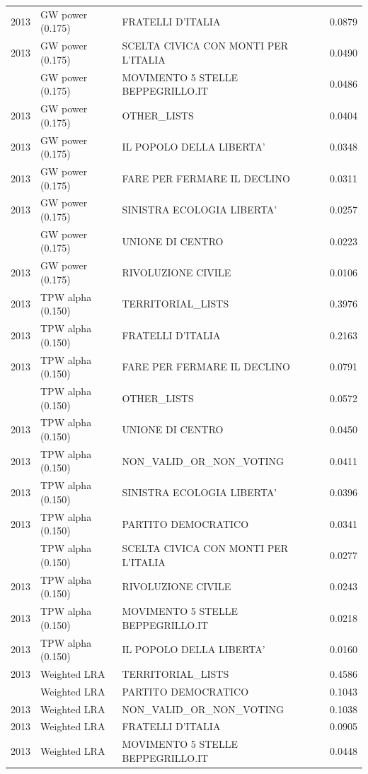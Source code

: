 \begin{longtable}[t]{rllr}
2013 & GW power (0.175) & FRATELLI D'ITALIA & 0.0879\\
2013 & GW power (0.175) & SCELTA CIVICA CON MONTI PER L'ITALIA & 0.0490\\
\addlinespace
2013 & GW power (0.175) & MOVIMENTO 5 STELLE BEPPEGRILLO.IT & 0.0486\\
2013 & GW power (0.175) & OTHER\_LISTS & 0.0404\\
2013 & GW power (0.175) & IL POPOLO DELLA LIBERTA' & 0.0348\\
2013 & GW power (0.175) & FARE PER FERMARE IL DECLINO & 0.0311\\
2013 & GW power (0.175) & SINISTRA ECOLOGIA LIBERTA' & 0.0257\\
\addlinespace
2013 & GW power (0.175) & UNIONE DI CENTRO & 0.0223\\
2013 & GW power (0.175) & RIVOLUZIONE CIVILE & 0.0106\\
2013 & TPW alpha (0.150) & TERRITORIAL\_LISTS & 0.3976\\
2013 & TPW alpha (0.150) & FRATELLI D'ITALIA & 0.2163\\
2013 & TPW alpha (0.150) & FARE PER FERMARE IL DECLINO & 0.0791\\
\addlinespace
2013 & TPW alpha (0.150) & OTHER\_LISTS & 0.0572\\
2013 & TPW alpha (0.150) & UNIONE DI CENTRO & 0.0450\\
2013 & TPW alpha (0.150) & NON\_VALID\_OR\_NON\_VOTING & 0.0411\\
2013 & TPW alpha (0.150) & SINISTRA ECOLOGIA LIBERTA' & 0.0396\\
2013 & TPW alpha (0.150) & PARTITO DEMOCRATICO & 0.0341\\
\addlinespace
2013 & TPW alpha (0.150) & SCELTA CIVICA CON MONTI PER L'ITALIA & 0.0277\\
2013 & TPW alpha (0.150) & RIVOLUZIONE CIVILE & 0.0243\\
2013 & TPW alpha (0.150) & MOVIMENTO 5 STELLE BEPPEGRILLO.IT & 0.0218\\
2013 & TPW alpha (0.150) & IL POPOLO DELLA LIBERTA' & 0.0160\\
2013 & Weighted LRA & TERRITORIAL\_LISTS & 0.4586\\
\addlinespace
2013 & Weighted LRA & PARTITO DEMOCRATICO & 0.1043\\
2013 & Weighted LRA & NON\_VALID\_OR\_NON\_VOTING & 0.1038\\
2013 & Weighted LRA & FRATELLI D'ITALIA & 0.0905\\
2013 & Weighted LRA & MOVIMENTO 5 STELLE BEPPEGRILLO.IT & 0.0448\\

\end{longtable}
